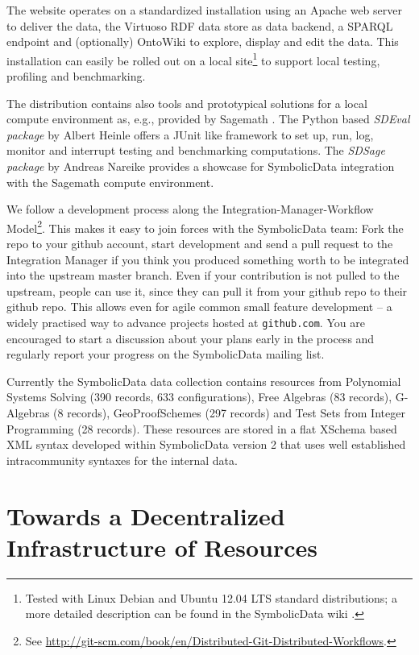 \documentclass{llncs}
\newcommand{\SD}{{\sc Symbolic\-Data}}
\begin{document}
The website operates on a standardized installation using an Apache web server
to deliver the data, the Virtuoso RDF data store \cite{Virtuoso} as data
backend, a SPARQL endpoint and (optionally) OntoWiki \cite{OntoWiki} to
explore, display and edit the data. This installation can easily be rolled out
on a local site\footnote{Tested with Linux Debian and Ubuntu 12.04 LTS
  standard distributions; a more detailed description can be found in the
  {\SD} wiki \cite{sdwiki}.} to support local testing, profiling and
benchmarking.

The distribution contains also tools and prototypical solutions for a local
compute environment as, e.g., provided by Sagemath \cite{Sagemath}.  The
Python based \emph{SDEval package} \cite{sdeval} by Albert Heinle offers a
JUnit like framework to set up, run, log, monitor and interrupt testing and
benchmarking computations. The \emph{SDSage package} \cite{sdsage} by Andreas
Nareike provides a showcase for {\SD} integration with the Sagemath
\cite{Sagemath} compute environment.

We follow a development process along the Integration-Manager-Workflow
Model\footnote{See \url{http://git-scm.com/book/en/Distributed-Git-Distributed-Workflows}.}.
This makes it easy to join forces with the {\SD} team: Fork the repo to your
github account, start development and send a pull request to the Integration
Manager if you think you produced something worth to be integrated into the
upstream master branch.  Even if your contribution is not pulled to the
upstream, people can use it, since they can pull it from your github repo to
their github repo. This allows even for agile common small feature development
-- a widely practised way to advance projects hosted at \texttt{github.com}.
You are encouraged to start a discussion about your plans early in the process
and regularly report your progress on the {\SD} mailing list.

Currently the {\SD} data collection contains resources from Polynomial Systems
Solving (390 records, 633 configurations), Free Algebras (83 records),
G-Algebras (8 records), GeoProofSchemes (297 records) and Test Sets from
Integer Programming (28 records). These resources are stored in a flat XSchema
based XML syntax developed within {\SD} version 2 that uses well established
intracommunity syntaxes for the internal data.

\section{Towards a Decentralized Infrastructure of Resources}
\end{document}
